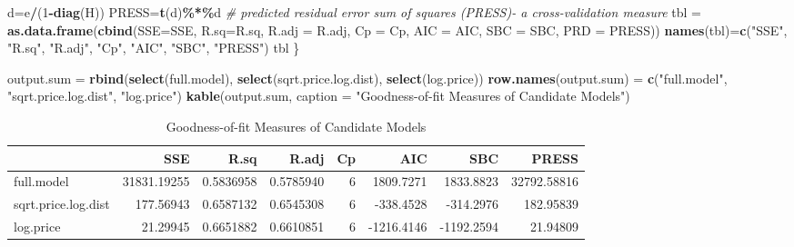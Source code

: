 \documentclass[
]{book}
\newenvironment{Shaded}{\begin{snugshade}}{\end{snugshade}}
\newcommand{\AttributeTok}[1]{\textcolor[rgb]{0.13,0.29,0.53}{#1}}
\newcommand{\CommentTok}[1]{\textcolor[rgb]{0.56,0.35,0.01}{\textit{#1}}}
\newcommand{\DecValTok}[1]{\textcolor[rgb]{0.00,0.00,0.81}{#1}}
\newcommand{\FunctionTok}[1]{\textcolor[rgb]{0.13,0.29,0.53}{\textbf{#1}}}
\newcommand{\NormalTok}[1]{#1}
\newcommand{\OtherTok}[1]{\textcolor[rgb]{0.56,0.35,0.01}{#1}}
\newcommand{\SpecialCharTok}[1]{\textcolor[rgb]{0.81,0.36,0.00}{\textbf{#1}}}
\newcommand{\StringTok}[1]{\textcolor[rgb]{0.31,0.60,0.02}{#1}}
\begin{document}
\begin{Shaded}
\begin{Highlighting}[]
\NormalTok{ d}\OtherTok{=}\NormalTok{e}\SpecialCharTok{/}\NormalTok{(}\DecValTok{1}\SpecialCharTok{{-}}\FunctionTok{diag}\NormalTok{(H))                       }
\NormalTok{ PRESS}\OtherTok{=}\FunctionTok{t}\NormalTok{(d)}\SpecialCharTok{\%*\%}\NormalTok{d   }\CommentTok{\# predicted residual error sum of squares (PRESS){-} a cross{-}validation measure}
\NormalTok{ tbl }\OtherTok{=} \FunctionTok{as.data.frame}\NormalTok{(}\FunctionTok{cbind}\NormalTok{(}\AttributeTok{SSE=}\NormalTok{SSE, }\AttributeTok{R.sq=}\NormalTok{R.sq, }\AttributeTok{R.adj =}\NormalTok{ R.adj, }\AttributeTok{Cp =}\NormalTok{ Cp, }\AttributeTok{AIC =}\NormalTok{ AIC, }\AttributeTok{SBC =}\NormalTok{ SBC, }\AttributeTok{PRD =}\NormalTok{ PRESS))}
 \FunctionTok{names}\NormalTok{(tbl)}\OtherTok{=}\FunctionTok{c}\NormalTok{(}\StringTok{"SSE"}\NormalTok{, }\StringTok{"R.sq"}\NormalTok{, }\StringTok{"R.adj"}\NormalTok{, }\StringTok{"Cp"}\NormalTok{, }\StringTok{"AIC"}\NormalTok{, }\StringTok{"SBC"}\NormalTok{, }\StringTok{"PRESS"}\NormalTok{)}
\NormalTok{ tbl}
\NormalTok{ \}}
\end{Highlighting}
\end{Shaded}

\begin{Shaded}
\begin{Highlighting}[]
\NormalTok{output.sum }\OtherTok{=} \FunctionTok{rbind}\NormalTok{(}\FunctionTok{select}\NormalTok{(full.model), }\FunctionTok{select}\NormalTok{(sqrt.price.log.dist), }\FunctionTok{select}\NormalTok{(log.price))}
\FunctionTok{row.names}\NormalTok{(output.sum) }\OtherTok{=} \FunctionTok{c}\NormalTok{(}\StringTok{"full.model"}\NormalTok{, }\StringTok{"sqrt.price.log.dist"}\NormalTok{, }\StringTok{"log.price"}\NormalTok{)}
\FunctionTok{kable}\NormalTok{(output.sum, }\AttributeTok{caption =} \StringTok{"Goodness{-}of{-}fit Measures of Candidate Models"}\NormalTok{)}
\end{Highlighting}
\end{Shaded}

\begin{table}

\caption{\label{tab:unnamed-chunk-89}Goodness-of-fit Measures of Candidate Models}
\centering
\begin{tabular}[t]{l|r|r|r|r|r|r|r}
\hline
  & SSE & R.sq & R.adj & Cp & AIC & SBC & PRESS\\
\hline
full.model & 31831.19255 & 0.5836958 & 0.5785940 & 6 & 1809.7271 & 1833.8823 & 32792.58816\\
\hline
sqrt.price.log.dist & 177.56943 & 0.6587132 & 0.6545308 & 6 & -338.4528 & -314.2976 & 182.95839\\
\hline
log.price & 21.29945 & 0.6651882 & 0.6610851 & 6 & -1216.4146 & -1192.2594 & 21.94809\\
\hline
\end{tabular}
\end{table}
\end{document}
